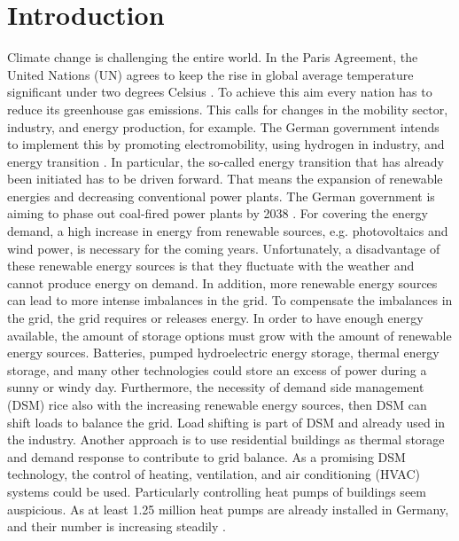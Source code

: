 \chapter{Introduction}
\label{ch:introduction}
Climate change is challenging the entire world. In the Paris Agreement, the United Nations (UN)  agrees to keep the rise in global average temperature significant under two degrees Celsius \cite{UnitedNations.2015}. To achieve this aim every nation has to reduce its greenhouse gas emissions. This calls for changes in the mobility sector, industry, and energy production, for example. The German government intends to implement this by promoting electromobility, using hydrogen in industry, and energy transition \cite{Deutschlandfunk.24.06.2021}. In particular, the so-called energy transition that has already been initiated has to be driven forward. That means the expansion of renewable energies and decreasing conventional power plants. The German government is aiming to phase out coal-fired power plants by 2038 \cite{bundesregierung.2021}. For covering the energy demand, a high increase in energy from renewable sources, e.g. photovoltaics and wind power, is necessary for the coming years. 
\newline
Unfortunately, a disadvantage of these renewable energy sources is that they fluctuate with the weather and cannot produce energy on demand. In addition, more renewable energy sources can lead to more intense imbalances in the grid.
To compensate the imbalances in the grid, the grid requires or releases energy. In order to have enough energy available, the amount of storage options must grow with the amount of renewable energy sources. Batteries, pumped hydroelectric energy storage, thermal energy storage, and many other technologies could store an excess of power during a sunny or windy day. Furthermore, the necessity of demand side management (DSM)  rice also with the increasing renewable energy sources, then DSM can shift loads to balance the grid. Load shifting is part of DSM \cite{Gellings.1985} and already used in the industry. Another approach is to use residential buildings as thermal storage and demand response to contribute to grid balance\cite{Kohlhepp.2017}. As a promising DSM technology, the control of heating, ventilation, and air conditioning (HVAC) systems could be used. Particularly controlling heat pumps of buildings seem auspicious. As at least 1.25 million heat pumps are already installed in Germany, and their number is increasing steadily \cite{BMW.2021}.
